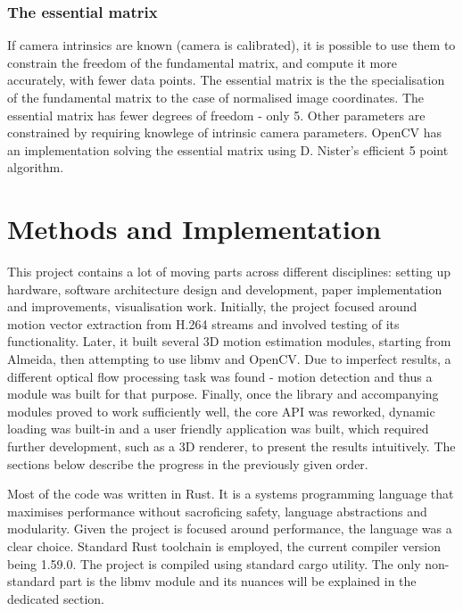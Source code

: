 \documentclass[11pt,english]{report}
\begin{document}
\subsection{The essential matrix}

If camera intrinsics are known (camera is calibrated), it is possible to use them to constrain the freedom of the fundamental matrix, and compute it more accurately, with fewer data points. The essential matrix is the the specialisation of the fundamental matrix to the case of normalised image coordinates\cite{hartley_zisserman_2004}. The essential matrix has fewer degrees of freedom - only 5. Other parameters are constrained by requiring knowlege of intrinsic camera parameters. OpenCV has an implementation solving the essential matrix using D. Nister's efficient 5 point algorithm\cite{1211470}.

\chapter{Methods and Implementation}

This project contains a lot of moving parts across different disciplines: setting up hardware, software architecture design and development, paper implementation and improvements, visualisation work. Initially, the project focused around motion vector extraction from H.264 streams and involved testing of its functionality. Later, it built several 3D motion estimation modules, starting from Almeida, then attempting to use libmv and OpenCV. Due to imperfect results, a different optical flow processing task was found - motion detection and thus a module was built for that purpose. Finally, once the library and accompanying modules proved to work sufficiently well, the core API was reworked, dynamic loading was built-in and a user friendly application was built, which required further development, such as a 3D renderer, to present the results intuitively. The sections below describe the progress in the previously given order.

Most of the code was written in Rust. It is a systems programming language that maximises performance without sacroficing safety, language abstractions and modularity. Given the project is focused around performance, the language was a clear choice. Standard Rust toolchain is employed, the current compiler version being 1.59.0. The project is compiled using standard cargo utility. The only non-standard part is the libmv module and its nuances will be explained in the dedicated section.
\end{document}
